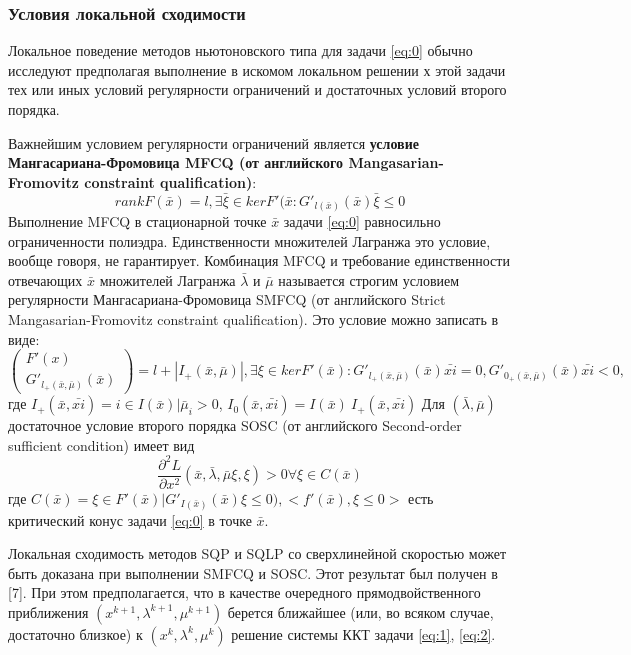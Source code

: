 \documentclass[12pt,a4paper]{article}
\begin{document}
	\subsubsection{Условия локальной сходимости}
	Локальное поведение методов ньютоновского типа для задачи \ref{eq:0} обычно исследуют предполагая выполнение в искомом локальном решении $х$ этой задачи тех или иных условий регулярности ограничений и достаточных условий второго порядка.
	
	Важнейшим условием регулярности ограничений является \textbf{условие Мангасариана-Фромовица MFCQ (от английского Mangasarian-Fromovitz constraint qualification)}:
	$$
		rank F(\bar{x}) = l, \exists\bar\xi \in kerF'(\bar{x} : G'_{l(\bar{x})}(\bar{x})\bar{\xi} \leq 0 
	$$
	Выполнение MFCQ в стационарной точке $\bar{x}$ задачи \ref{eq:0} равносильно ограниченности полиэдра. Единственности множителей Лагранжа это условие, вообще говоря, не гарантирует. Комбинация MFCQ и требование единственности отвечающих $\bar{x}$ множителей Лагранжа $\bar{\lambda}$ и $\bar{\mu}$ называется строгим условием регулярности Мангасариана-Фромовица SMFCQ (от английского Strict
	Mangasarian-Fromovitz constraint qualification). Это условие можно записать в виде:
	\begin{equation}
		\begin{pmatrix}
		F'(x)\\
			G'_{l_{+}(\bar{x}, \bar{\mu})}(\bar{x})
		\end{pmatrix} = l + |I_{+}(\bar{x}, \bar{\mu})|,
	\exists \xi \in kerF'(\bar{x}): 	G'_{l_{+}(\bar{x}, \bar{\mu})}(\bar{x})\bar{xi} = 0, 	G'_{0_{+}(\bar{x}, \bar{\mu})}(\bar{x})\bar{xi} < 0,
	\end{equation}
где 
$I_+(\bar{x},\bar{xi}) = {i \in I(\bar{x})|\bar{\mu}_i > 0}$, 
$ I_0(\bar{x},\bar{xi}) = I(\bar{x}) \ I_+(\bar{x},\bar{xi})$	
	Для $(\bar{\lambda}, \bar{\mu})$ достаточное условие второго порядка SOSC (от английского Second-order
	sufficient condition) имеет вид
	\begin{equation}
		\frac{\partial^2 L}{\partial x^2}(\bar{x}, \bar{\lambda}, \bar{\mu}\xi, \xi) > 0 \forall\xi \in C(\bar{x})	
	\end{equation}	 
	где $C(\bar{x}) = {\xi \in F'(\bar{x})|G'_{I(\bar{x})}(\bar{x})\xi \leq 0)}, <f'(\bar{x}), \xi\leq 0>$ есть критический конус задачи \ref{eq:0} в точке $\bar{x}$.
	
	
Локальная сходимость методов SQP и SQLP со сверхлинейной скоростью может быть доказана при выполнении SMFCQ и SOSC. Этот результат был получен
в [7]. При этом предполагается, что в качестве очередного прямодвойственного приближения $(x^{k+1},\lambda^{k+1}, \mu^{k+1})$ берется ближайшее (или, во всяком случае, достаточно
близкое) к $(x^{k},\lambda^{k}, \mu^{k})$ решение системы ККТ задачи \ref{eq:1}, \ref{eq:2}.	
\end{document}
